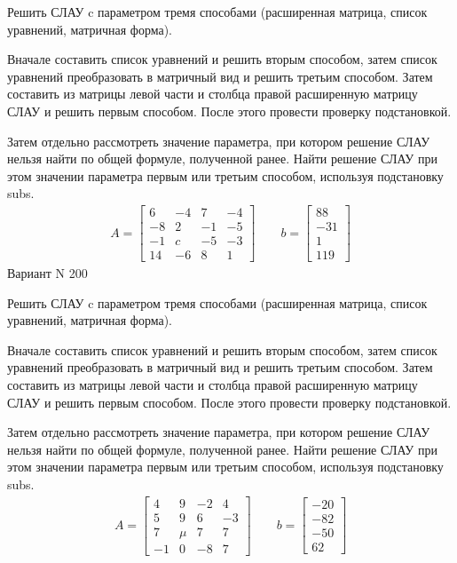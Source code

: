 \documentclass[11pt]{report}
\begin{document}
Решить СЛАУ c параметром тремя способами (расширенная матрица, список уравнений, матричная форма).

Вначале составить список уравнений и решить вторым способом,
затем список уравнений преобразовать в матричный вид и решить третьим способом.
Затем составить из матрицы левой части и столбца правой расширенную матрицу СЛАУ и решить первым способом.
После этого провести проверку подстановкой.

Затем отдельно рассмотреть значение параметра, при котором решение СЛАУ нельзя найти по общей формуле,
полученной ранее.
Найти решение СЛАУ при этом значении параметра первым или третьим способом, используя подстановку subs.
\begin{align*}
    A = \left[\begin{matrix}6 & -4 & 7 & -4\\-8 & 2 & -1 & -5\\-1 & c & -5 & -3\\14 & -6 & 8 & 1\end{matrix}\right]
\qquad b = \left[\begin{matrix}88\\-31\\1\\119\end{matrix}\right]
\end{align*}
\newpage
Вариант N 200


Решить СЛАУ c параметром тремя способами (расширенная матрица, список уравнений, матричная форма).

Вначале составить список уравнений и решить вторым способом,
затем список уравнений преобразовать в матричный вид и решить третьим способом.
Затем составить из матрицы левой части и столбца правой расширенную матрицу СЛАУ и решить первым способом.
После этого провести проверку подстановкой.

Затем отдельно рассмотреть значение параметра, при котором решение СЛАУ нельзя найти по общей формуле,
полученной ранее.
Найти решение СЛАУ при этом значении параметра первым или третьим способом, используя подстановку subs.
\begin{align*}
    A = \left[\begin{matrix}4 & 9 & -2 & 4\\5 & 9 & 6 & -3\\7 & \mu & 7 & 7\\-1 & 0 & -8 & 7\end{matrix}\right]
\qquad b = \left[\begin{matrix}-20\\-82\\-50\\62\end{matrix}\right]
\end{align*}
\newpage
\end{document}
